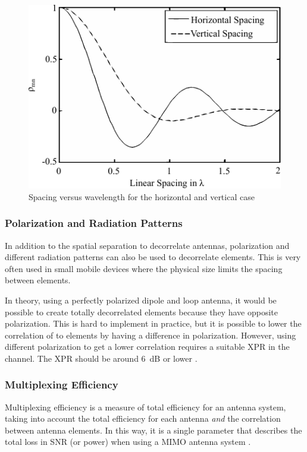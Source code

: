 \begin{figure}[htbp]
  \centering
  \includegraphics[scale=1.2]{img/analysis/mimoSpacing}
  \caption{Spacing versus wavelength for the horizontal and vertical case \cite{Tim2012Practical}}
  \label{fig:mimo-spacing}
\end{figure}

\subsubsection{Polarization and Radiation Patterns}
In addition to the spatial separation to decorrelate antennas, polarization and different radiation patterns can also be used to decorrelate elements. This is very often used in small mobile devices where the physical size limits the spacing between elements.  

In theory, using a perfectly polarized dipole and loop antenna, it would be possible to create totally decorrelated elements because they have opposite polarization. This is hard to implement in practice, but it is possible to lower the correlation of to elements by having a difference in polarization. However, using different polarization to get a lower correlation requires a suitable XPR in the channel. The XPR should be around \SI{6}{dB} or lower \cite{Tim2012Practical}. 

\subsubsection{Multiplexing Efficiency}
\label{sec:muxefficiency}

Multiplexing efficiency is a measure of total efficiency for an antenna system, taking into account the total efficiency for each antenna \emph{and} the correlation between antenna elements. In this way, it is a single parameter that describes the total loss in SNR (or power) when using a MIMO antenna system \cite{tian2011multiplexing}.

